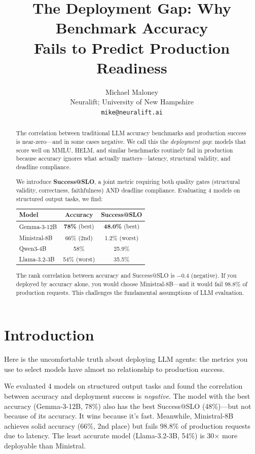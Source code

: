 \documentclass[11pt]{article}
\title{The Deployment Gap: Why Benchmark Accuracy\\Fails to Predict Production Readiness}
\author{
Michael Maloney \\
Neuralift; University of New Hampshire \\
\texttt{mike@neuralift.ai}
}
\date{}
\begin{document}
\maketitle

\begin{abstract}
The correlation between traditional LLM accuracy benchmarks and production success is near-zero---and in some cases negative.
We call this the \emph{deployment gap}: models that score well on MMLU, HELM, and similar benchmarks routinely fail in production because accuracy ignores what actually matters---latency, structural validity, and deadline compliance.

We introduce \textbf{Success@SLO}, a joint metric requiring both quality gates (structural validity, correctness, faithfulness) AND deadline compliance.
Evaluating 4 models on structured output tasks, we find:

\begin{center}
\begin{tabular}{lcc}
\toprule
\textbf{Model} & \textbf{Accuracy} & \textbf{Success@SLO} \\
\midrule
Gemma-3-12B & \textbf{78\%} (best) & \textbf{48.0\%} (best) \\
Ministral-8B & 66\% (2nd) & 1.2\% (worst) \\
Qwen3-4B & 58\% & 25.9\% \\
Llama-3.2-3B & 54\% (worst) & 35.5\% \\
\bottomrule
\end{tabular}
\end{center}

The rank correlation between accuracy and Success@SLO is $-0.4$ (negative).
If you deployed by accuracy alone, you would choose Ministral-8B---and it would fail 98.8\% of production requests.
This challenges the fundamental assumptions of LLM evaluation.
\end{abstract}

\section{Introduction}

Here is the uncomfortable truth about deploying LLM agents: the metrics you use to select models have almost no relationship to production success.

We evaluated 4 models on structured output tasks and found the correlation between accuracy and deployment success is \emph{negative}.
The model with the best accuracy (Gemma-3-12B, 78\%) also has the best Success@SLO (48\%)---but not because of its accuracy.
It wins because it's fast.
Meanwhile, Ministral-8B achieves solid accuracy (66\%, 2nd place) but fails 98.8\% of production requests due to latency.
The least accurate model (Llama-3.2-3B, 54\%) is 30$\times$ more deployable than Ministral.
\end{document}
